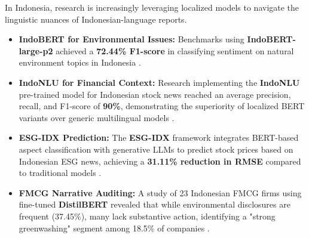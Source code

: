 \documentclass{article}
\begin{document}
In Indonesia, research is increasingly leveraging localized models to navigate the linguistic nuances of Indonesian-language reports.
\begin{itemize}
\item 

\textbf{IndoBERT for Environmental Issues:} Benchmarks using \textbf{IndoBERT-large-p2} achieved a \textbf{72.44\% F1-score} in classifying sentiment on natural environment topics in Indonesia  \parencite{christofer_octovianto_487e90aa}.\item 

\textbf{IndoNLU for Financial Context:} Research implementing the \textbf{IndoNLU} pre-trained model for Indonesian stock news reached an average precision, recall, and F1-score of \textbf{90\%}, demonstrating the superiority of localized BERT variants over generic multilingual models  \parencite{muhammad_riza_alifi_66b78fb0}.\item 

\textbf{ESG-IDX Prediction:} The \textbf{ESG-IDX} framework integrates BERT-based aspect classification with generative LLMs to predict stock prices based on Indonesian ESG news, achieving a \textbf{31.11\% reduction in RMSE} compared to traditional models  \parencite{ubaidillah_ariq_prathama_a1856e2f}.\item 

\textbf{FMCG Narrative Auditing:} A study of 23 Indonesian FMCG firms using fine-tuned \textbf{DistilBERT} revealed that while environmental disclosures are frequent (37.45\%), many lack substantive action, identifying a "strong greenwashing" segment among 18.5\% of companies  \parencite{anisa_kusuma_putri_4109a23b}.
\end{itemize}
\end{document}
